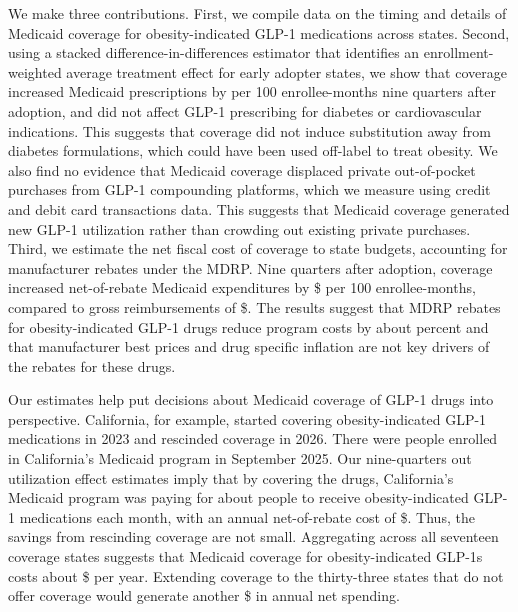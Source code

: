 We make three contributions. First, we compile data on the timing and details of Medicaid coverage for obesity-indicated GLP-1 medications across states. Second, using a stacked difference-in-differences estimator that identifies an enrollment-weighted average treatment effect for early adopter states, we show that coverage increased Medicaid prescriptions by \rxObSevenNineEmw{} per 100 enrollee-months nine quarters after adoption, and did not affect GLP-1 prescribing for diabetes or cardiovascular indications. This suggests that coverage did not induce substitution away from diabetes formulations, which could have been used off-label to treat obesity. We also find no evidence that Medicaid coverage displaced private out-of-pocket purchases from GLP-1 compounding platforms, which we measure using credit and debit card transactions data. This suggests that Medicaid coverage generated new GLP-1 utilization rather than crowding out existing private purchases. Third, we estimate the net fiscal cost of coverage to state budgets, accounting for manufacturer rebates under the MDRP. Nine quarters after adoption, coverage increased net-of-rebate Medicaid expenditures by \$\netSpObSevenNineEmw{} per 100 enrollee-months, compared to gross reimbursements of \$\spObSevenNineEmw{}. The results suggest that MDRP rebates for obesity-indicated GLP-1 drugs reduce program costs by about \spReductionObSevenNineEmw{} percent and that manufacturer best prices and drug specific inflation are not key drivers of the rebates for these drugs. 

Our estimates help put decisions about Medicaid coverage of GLP-1 drugs into perspective. California, for example, started covering obesity-indicated GLP-1 medications in 2023 and rescinded coverage in 2026. There were \enrollCA{} people enrolled in California's Medicaid program in September 2025. Our nine-quarters out utilization effect estimates imply that by covering the drugs, California's Medicaid program was paying for about \usersCAetNine{} people to receive obesity-indicated GLP-1 medications each month, with an annual net-of-rebate cost of \$\netCostCAetNine{}. Thus, the savings from rescinding coverage are not small. Aggregating across all seventeen coverage states suggests that Medicaid coverage for obesity-indicated GLP-1s costs about \$\netCostCoveringEtNine{} per year. Extending coverage to the thirty-three states that do not offer coverage would generate another \$\netCostNoncoveringEtNine{} in annual net spending.